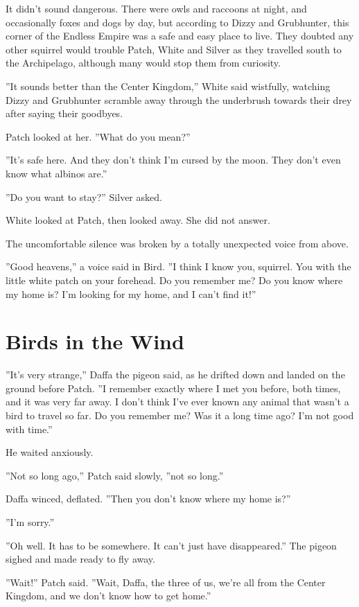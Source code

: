\documentclass[12pt]{book}
\begin{document}
It didn't sound dangerous. There were owls and raccoons at night, and occasionally foxes and dogs by day, but according to Dizzy and Grubhunter, this corner of the Endless Empire was a safe and easy place to live. They doubted any other squirrel would trouble Patch, White and Silver as they travelled south to the Archipelago, although many would stop them from curiosity.

''It sounds better than the Center Kingdom,'' White said wistfully, watching Dizzy and Grubhunter scramble away through the underbrush towards their drey after saying their goodbyes.

Patch looked at her. ''What do you mean?''

''It's safe here. And they don't think I'm cursed by the moon. They don't even know what albinos are.''

''Do you want to stay?'' Silver asked.

White looked at Patch, then looked away. She did not answer.

The uncomfortable silence was broken by a totally unexpected voice from above.

''Good heavens,'' a voice said in Bird. ''I think I know you, squirrel. You with the little white patch on your forehead. Do you remember me? Do you know where my home is? I'm looking for my home, and I can't find it!''


\section{Birds in the Wind}

''It's very strange,'' Daffa the pigeon said, as he drifted down and landed on the ground before Patch. ''I remember exactly where I met you before, both times, and it was very far away. I don't think I've ever known any animal that wasn't a bird to travel so far. Do you remember me? Was it a long time ago? I'm not good with time.''

He waited anxiously.

''Not so long ago,'' Patch said slowly, ''not so long.''

Daffa winced, deflated. ''Then you don't know where my home is?''

''I'm sorry.''

''Oh well. It has to be somewhere. It can't just have disappeared.'' The pigeon sighed and made ready to fly away.

''Wait!'' Patch said. ''Wait, Daffa, the three of us, we're all from the Center Kingdom, and we don't know how to get home.''
\end{document}
